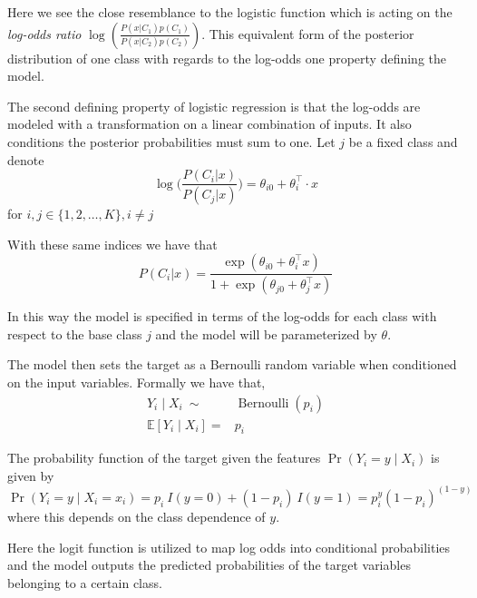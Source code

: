 Here we see the close resemblance to the logistic function which is acting on the \textit{log-odds ratio} $ \log(  \frac{ P(x|C_1)p(C_1)}{P(x|C_2)p(C_2) })$. This equivalent form of the posterior distribution of one class with regards to the log-odds one property defining the model.



The second defining property of logistic regression is that the log-odds are modeled with a transformation on a linear combination of inputs. It also conditions the posterior probabilities must sum to one. Let $j$ be a fixed class and denote
\begin{equation}\label{logit-logOddss}
 \log\big( \frac{P(C_i|x)}{P(C_j|x)}\big) = \theta_{i0} + \theta_i^\intercal \cdot x
 \end{equation}
for $i,j \in \{1,2,\ldots,K\}, i\neq j$

With these same indices we have that
\begin{equation} P(C_i|x) = \frac{\exp(\theta_{i0} + \theta_i^\intercal x)}{1 + \exp(\theta_{j0} + \theta_j^\intercal x)}
\end{equation}

In this way the model is specified in terms of the log-odds for each class with respect to the base class $j$ and the model will be parameterized by $\theta$.

The model then sets the target as a Bernoulli random variable when conditioned on the input variables. Formally we have that,
\begin{equation}
\begin{split}
Y_i \mid X_i \ \sim & \operatorname{Bernoulli}(p_i) \\
\mathbb{E}[Y_i \mid X_i ] = & p_i
\end{split}
\end{equation}


The probability function of the target given the features $\Pr(Y_i=y\mid X_i)$ is given by
\begin{equation}\label{logit-probabilityDensity}
\Pr(Y_i=y \mid X_i = x_i) = p_i \ I(y=0) + (1-p_i) \ I(y=1) = p_i^{y} {(1-p_i)}^{(1-y)}
\end{equation}
where this depends on the class dependence of $y$.

Here the logit function is utilized to map log odds into conditional probabilities and the model outputs the predicted probabilities of the target variables belonging to a certain class.

